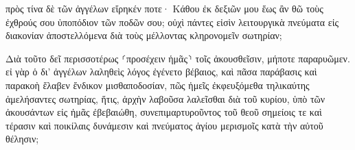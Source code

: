 \documentclass{openreader}
\begin{document}
πρὸς τίνα δὲ τῶν ἀγγέλων εἴρηκέν ποτε· Κάθου ἐκ δεξιῶν μου ἕως ἂν θῶ τοὺς ἐχθρούς σου ὑποπόδιον τῶν ποδῶν σου; 
οὐχὶ πάντες εἰσὶν λειτουργικὰ πνεύματα εἰς διακονίαν ἀποστελλόμενα διὰ τοὺς μέλλοντας κληρονομεῖν σωτηρίαν; 

Διὰ τοῦτο δεῖ περισσοτέρως ⸂προσέχειν ἡμᾶς⸃ τοῖς ἀκουσθεῖσιν, μήποτε παραρυῶμεν. 
εἰ γὰρ ὁ δι’ ἀγγέλων λαληθεὶς λόγος ἐγένετο βέβαιος, καὶ πᾶσα παράβασις καὶ παρακοὴ ἔλαβεν ἔνδικον μισθαποδοσίαν, 
πῶς ἡμεῖς ἐκφευξόμεθα τηλικαύτης ἀμελήσαντες σωτηρίας, ἥτις, ἀρχὴν λαβοῦσα λαλεῖσθαι διὰ τοῦ κυρίου, ὑπὸ τῶν ἀκουσάντων εἰς ἡμᾶς ἐβεβαιώθη, 
συνεπιμαρτυροῦντος τοῦ θεοῦ σημείοις τε καὶ τέρασιν καὶ ποικίλαις δυνάμεσιν καὶ πνεύματος ἁγίου μερισμοῖς κατὰ τὴν αὐτοῦ θέλησιν; 
\end{document}
